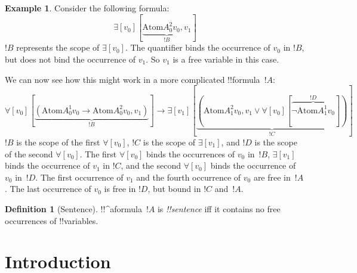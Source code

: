 \documentclass[10pt,a4paper]{article}
\theoremstyle{plain}
\theoremstyle{definition}
\newtheorem{defn}[thm]{Definition}
\newtheorem{ex}[thm]{Example}
\theoremstyle{remark}
\newcommand*{\olfileid}[3]{}
\newcommand*{\olsection}[1]{\section*{#1}}
\providecommand{\lif}{\mathbin{\rightarrow}}
\providecommand{\lforall}{\mathord{\forall}}
\providecommand{\lexists}{\mathord{\exists}}
\providecommand{\Obj}{}
\providecommand{\Atom}{\mathrm{Atom}}
\begin{document}
\begin{ex}
Consider the following formula:
\[
\lexists[\Obj v_0][\underbrace{\Atom{\Obj A^2_0}{\Obj v_0,\Obj v_1}}_{!B}] 
\]
$!B$ represents the scope of $\lexists[\Obj v_0]$. 
The quantifier binds the occurrence of $\Obj v_0$ in $!B$, but
does not bind the occurrence of $\Obj v_1$. So $\Obj v_1$ is
a free variable in this case.


We can now see how this might work in a more complicated 
!!{formula}~$!A$:
\[
\lforall[\Obj v_0][\underbrace{(\Atom{\Obj A^1_0}{\Obj v_0} \lif
    \Atom{\Obj A^2_0}{\Obj v_0, \Obj v_1})}_{!B}] \lif \lexists[\Obj
  v_1][\underbrace{(\Atom{\Obj A^2_1}{\Obj v_0, \Obj v_1} \lor \lforall[\Obj v_0][\overbrace{\lnot \Atom{\Obj A^1_1}{\Obj v_0}}^{!D}])}_{!C}]
\]
$!B$ is the scope of the first $\lforall[\Obj v_0]$, $!C$ is the scope
of $\lexists[\Obj v_1]$, and $!D$ is the scope of the second
$\lforall[\Obj v_0]$.  The first $\lforall[\Obj v_0]$ binds the
occurrences of $\Obj v_0$ in~$!B$, $\lexists[\Obj v_1]$ binds the occurrence
of $\Obj v_1$ in $!C$, and the second $\lforall[\Obj v_0]$ binds the
occurrence of $\Obj v_0$ in~$!D$.  The first occurrence of $\Obj v_1$
and the fourth occurrence of $\Obj v_0$ are free in~$!A$. The last
occurrence of $\Obj v_0$ is free in $!D$, but bound in $!C$ and~$!A$.
\end{ex}

\begin{defn}[Sentence]
!!^a{formula}~$!A$ is  \emph{!!{sentence}} iff it
contains no free occurrences of !!{variable}s.
\end{defn}






\olfileid{fol}{syn}{its}

\olsection{Introduction}
\end{document}

